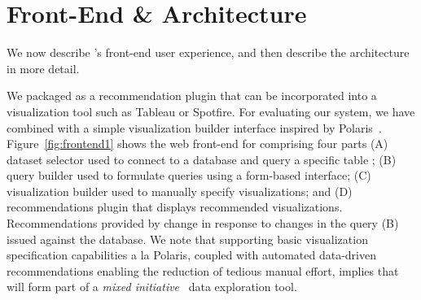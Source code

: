 
\section{{\large \SeeDB} Front-End \& Architecture}
\label{sec:system_architecture}


We now describe \SeeDB's front-end user experience, and then
describe the architecture in more detail.

We packaged \SeeDB as a recommendation plugin that can
be incorporated into a visualization tool such as Tableau or Spotfire. 
For evaluating our system, we have combined \SeeDB with a simple visualization
builder interface inspired by Polaris~\cite{polaris}.
Figure~\ref{fig:frontend1} shows the web front-end for \SeeDB 
comprising four parts 
(A) dataset selector used to connect to a database and query a specific table ; 
(B) query builder used to
formulate queries using a form-based interface; 
(C) visualization builder used to manually specify visualizations; and 
(D) \SeeDB recommendations plugin 
that displays recommended visualizations.
Recommendations provided by \SeeDB change in 
response to changes in the query (B)
issued against the database.
We note that supporting basic visualization specification 
capabilities a la Polaris, coupled with automated data-driven recommendations enabling
the reduction of tedious manual effort,
implies that \SeeDB will form part of a
{\em mixed initiative}~\cite{mixed_initiative} data exploration tool.


